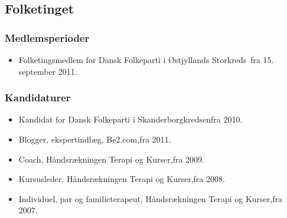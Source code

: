 \documentclass[11pt, a4paper]{awesome-cv}
\begin{document}
\begin{cvletter}
\subsection*{Folketinget}
\subsubsection*{Medlemsperioder}
\begin{itemize}
\item Folketingsmedlem for Dansk Folkeparti i Østjyllands Storkreds fra 15. september 2011.
\end{itemize}
\subsubsection*{Kandidaturer}
\begin{itemize}
\item Kandidat for Dansk Folkeparti i Skanderborgkredsenfra 2010.
\end{itemize}
\begin{itemize}
\item Blogger, ekspertindlæg, Be2.com,fra 2011.
\item Coach, Håndsrækningen Terapi og Kurser,fra 2009.
\item Kursusleder, Håndsrækningen Terapi og Kurser,fra 2008.
\item Individuel, par og familieterapeut, Håndsrækningen Terapi og Kurser,fra 2007.
\end{itemize}
\end{cvletter}
\end{document}
